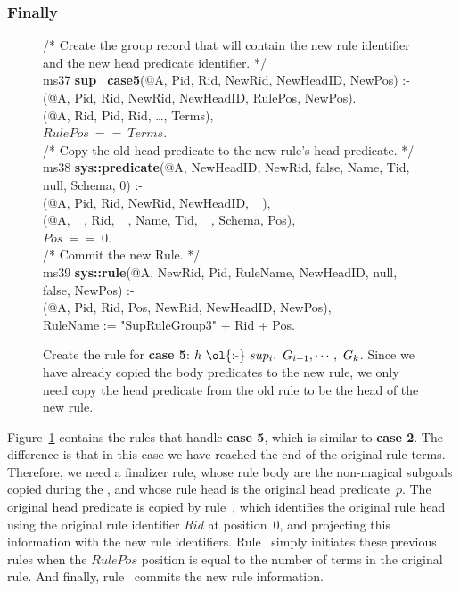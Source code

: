\subsubsection{Finally}

\begin{figure}[!t]
\ssp
\centering
\begin{boxedminipage}{\linewidth}
/* Create the group record that will contain the new rule identifier \\
and the new head predicate identifier. */ \\
ms37 {\bf sup\_case5}(@A, Pid, Rid, NewRid, NewHeadID, NewPos) :- \\
(@A, Pid, Rid, NewRid, NewHeadID, RulePos, NewPos). \\
(@A, Rid, Pid, Rid, \ldots, Terms), \\
\datalogspace $RulePos\ ==\ Terms$. \\
	
/* Copy the old head predicate to the new rule's head predicate. */ \\
ms38 {\bf sys::predicate}(@A, NewHeadID, NewRid, false, Name, Tid, null, Schema, 0) :- \\
(@A, Pid, Rid, NewRid, NewHeadID, \_), \\
(@A, \_, Rid, \_, Name, Tid, \_, Schema, Pos), \\
\datalogspace $Pos\ ==\ 0$. \\
	
/* Commit the new Rule. */ \\
ms39 {\bf sys::rule}(@A, NewRid, Pid, RuleName, NewHeadID, null, false, NewPos) :- \\
(@A, Pid, Rid, Pos, NewRid, NewHeadID, NewPos), \\
\datalogspace RuleName := "SupRuleGroup3" + Rid + Pos.

\end{boxedminipage}
\caption{\label{ch:magic:fig:rewrite9} 
Create the rule for {\bf case 5}: $h\ \text{\ol{:-}}\ sup_i,\ G_{i+1}, \cdots,\ G_k$. 
Since we have already copied the body predicates to the new rule, we only
need copy the head predicate from the old rule to be the head of the new rule.}
\end{figure}

Figure~\ref{ch:magic:fig:rewrite9} contains the rules that handle {\bf case 5},
which is similar to {\bf case 2}.  The difference is that in this case we have
reached the end of the original rule terms.  Therefore, we need a finalizer
rule, whose rule body are the non-magical subgoals copied during the
, and whose rule head is the original head predicate~$p$.  The
original head predicate is copied by rule~, which identifies the
original rule head using the original rule identifier $Rid$ at position~$0$,
and projecting this information with the new rule identifiers.  Rule~
simply initiates these previous rules when the $RulePos$ position is equal to
the number of terms in the original rule.  And finally, rule~ commits
the new rule information.

